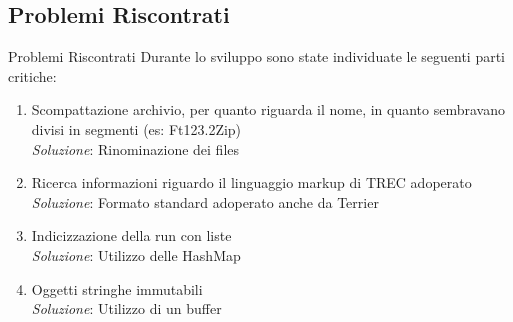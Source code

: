 \subsection{Problemi Riscontrati}
\begin{frame}{Problemi Riscontrati}
	Durante lo sviluppo sono state individuate le seguenti parti critiche:
	\begin{enumerate}
		\item Scompattazione archivio, per quanto riguarda il nome, in quanto sembravano divisi in segmenti (es: Ft123.2Zip) 
				\\ \textit{Soluzione}: Rinominazione dei files
		\item Ricerca informazioni riguardo il linguaggio markup di TREC adoperato
				\\ \textit{Soluzione}: Formato standard adoperato anche da Terrier
		\item Indicizzazione della run con liste
				\\ \textit{Soluzione}: Utilizzo delle HashMap
		\item Oggetti stringhe immutabili
				\\ \textit{Soluzione}: Utilizzo di un buffer
	\end{enumerate}
\end{frame}


